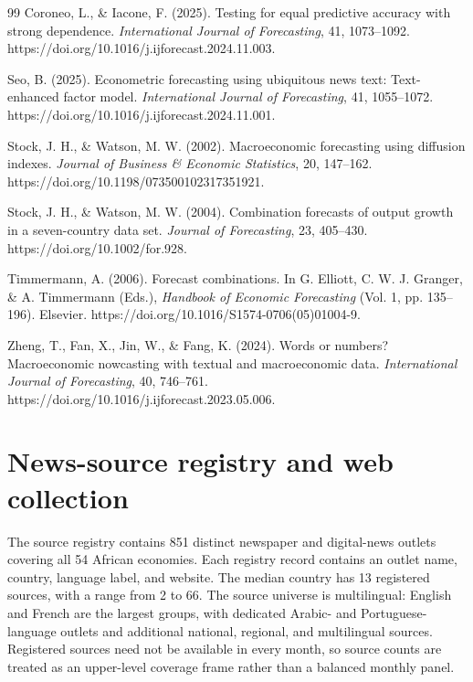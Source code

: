 \documentclass[preprint,12pt,authoryear]{elsarticle}
\begin{document}
\begin{thebibliography}{99}
Coroneo, L., \& Iacone, F. (2025). Testing for equal predictive accuracy with
strong dependence. \emph{International Journal of Forecasting}, 41,
1073--1092. https://doi.org/10.1016/j.ijforecast.2024.11.003.

Seo, B. (2025). Econometric forecasting using ubiquitous news text:
Text-enhanced factor model. \emph{International Journal of Forecasting}, 41,
1055--1072. https://doi.org/10.1016/j.ijforecast.2024.11.001.

Stock, J. H., \& Watson, M. W. (2002). Macroeconomic forecasting using
diffusion indexes. \emph{Journal of Business \& Economic Statistics}, 20,
147--162. https://doi.org/10.1198/073500102317351921.

Stock, J. H., \& Watson, M. W. (2004). Combination forecasts of output growth
in a seven-country data set. \emph{Journal of Forecasting}, 23, 405--430.
https://doi.org/10.1002/for.928.

Timmermann, A. (2006). Forecast combinations. In G. Elliott,
C. W. J. Granger, \& A. Timmermann (Eds.), \emph{Handbook of Economic
Forecasting} (Vol. 1, pp. 135--196). Elsevier.
https://doi.org/10.1016/S1574-0706(05)01004-9.

Zheng, T., Fan, X., Jin, W., \& Fang, K. (2024). Words or numbers?
Macroeconomic nowcasting with textual and macroeconomic data.
\emph{International Journal of Forecasting}, 40, 746--761.
https://doi.org/10.1016/j.ijforecast.2023.05.006.

\end{thebibliography}
\endgroup

\clearpage
\appendix
\makeatletter
{}
\makeatother
\setcounter{table}{0}
\setcounter{figure}{0}
\setcounter{equation}{0}
\section{News-source registry and web collection}
The source registry contains 851 distinct newspaper and digital-news outlets covering all 54 African economies. Each registry record contains an outlet name, country, language label, and website. The median country has 13 registered sources, with a range from 2 to 66. The source universe is multilingual: English and French are the largest groups, with dedicated Arabic- and Portuguese-language outlets and additional national, regional, and multilingual sources. Registered sources need not be available in every month, so source counts are treated as an upper-level coverage frame rather than a balanced monthly panel.
\end{document}
